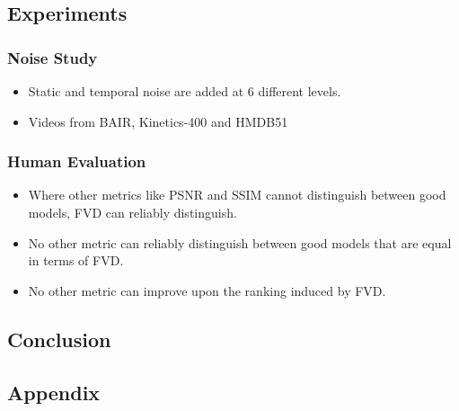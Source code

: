 \documentclass{article}
\begin{document}
    \subsection{Experiments}\label{subsec:FVD_A_new_Metric_for_Video_Generation:experiments}

    \subsubsection{Noise Study}\label{subsubsec:FVD_A_new_Metric_for_Video_Generation:noise-study}
    \begin{itemize}
        \item Static and temporal noise are added at 6 different levels.
        \item Videos from BAIR, Kinetics-400 and HMDB51
    \end{itemize}

    \subsubsection{Human Evaluation}\label{subsubsec:FVD_A_new_Metric_for_Video_Generation:human-evaluation}
    \begin{itemize}
        \item Where other metrics like PSNR and SSIM cannot distinguish between good models, FVD can reliably distinguish.
        \item No other metric can reliably distinguish between good models that are equal in terms of FVD\@.
        \item No other metric can improve upon the ranking induced by FVD\@.
    \end{itemize}

    \subsection{Conclusion}\label{subsec:FVD_A_new_Metric_for_Video_Generation:conclusion}

    \subsection{Appendix}\label{subsec:FVD_A_new_Metric_for_Video_Generation:appendix}
\end{document}
